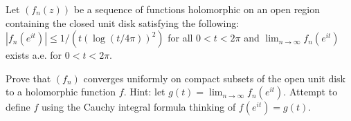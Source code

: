 Let $(f_n(z))$ be a sequence of functions holomorphic on an open
region containing the closed unit disk satisfying the following:
$|f_n(e^{it})|\leq 1/(t(\log(t/4\pi))^2)$ for all $0<t<2\pi$ and
$\lim_{n\rightarrow \infty}f_n(e^{it})$ exists a.e. for $0<t<2\pi$.

Prove that $(f_n)$ converges uniformly on compact subsets of the open
unit disk to a holomorphic function $f$. Hint: let
$g(t)=\lim_{n\rightarrow \infty}f_n(e^{it})$. Attempt to define $f$
using the Cauchy integral formula thinking of $f(e^{it})=g(t)$.
